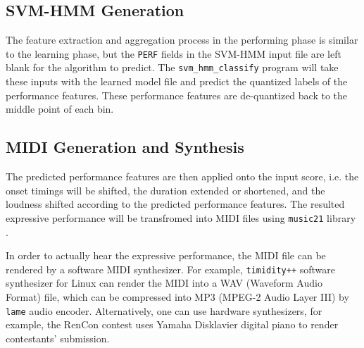 \subsection{SVM-HMM Generation}
The feature extraction and aggregation process in the performing phase is similar to the learning phase, but the \texttt{PERF} fields in the SVM-HMM input file are left blank for the algorithm to predict. The \texttt{svm\_hmm\_classify} program will take these inputs with the learned model file and predict the quantized labels of the performance features. These performance features are de-quantized back to the middle point of each bin. 

      
\subsection{MIDI Generation and Synthesis}

The predicted performance features are then applied onto the input score, i.e. the onset timings will be shifted, the duration extended or shortened, and the loudness shifted according to the predicted performance features. The resulted expressive performance will be transfromed into MIDI files using \texttt{music21} library \cite{music21}.%

In order to actually hear the expressive performance, the MIDI file can be rendered by a software MIDI synthesizer. %
For example, \texttt{timidity++} software synthesizer for Linux can render the MIDI into a WAV (Waveform Audio Format) file, which can be compressed into MP3 (MPEG-2 Audio Layer III) by \texttt{lame} audio encoder. Alternatively, one can use hardware synthesizers, for example, the RenCon \cite{RenCon} contest uses Yamaha Disklavier digital piano to render contestants' submission.

